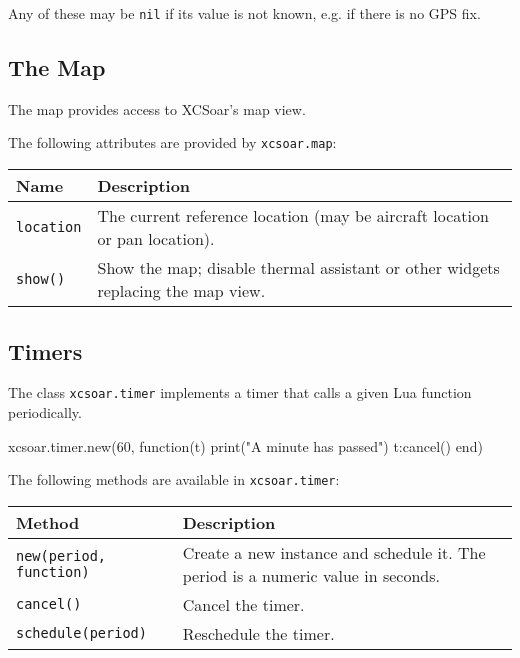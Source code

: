 Any of these may be \verb|nil| if its value is not known, e.g. if
there is no GPS fix.

\subsection{The Map}

The map provides access to XCSoar's map view.

The following attributes are provided by \verb|xcsoar.map|:

\begin{maxipage}
\begin{tabular}{l|p{12cm}}
Name & Description \\
\hline\hline

\verb|location| & The current reference location (may be aircraft location or
pan location). \\

\hline

\verb|show()| & Show the map; disable thermal assistant or other
widgets replacing the map view. \\

\end{tabular}
\end{maxipage}

\subsection{Timers}

The class \verb|xcsoar.timer| implements a timer that calls a given
Lua function periodically.

\begin{lua}
xcsoar.timer.new(60, function(t)
  print("A minute has passed")
  t:cancel()
end)
\end{lua}

The following methods are available in \verb|xcsoar.timer|:

\begin{maxipage}
\begin{tabular}{l|p{10cm}}
Method & Description \\
\hline\hline

\verb|new(period, function)| & Create a new instance and schedule
it.  The period is a numeric value in seconds. \\

\hline

\verb|cancel()| & Cancel the timer. \\

\hline

\verb|schedule(period)| & Reschedule the timer. \\

\end{tabular}
\end{maxipage}

